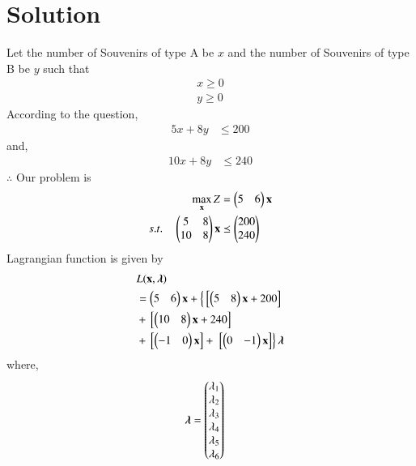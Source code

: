 \documentclass[journal,12pt,twocolumn]{IEEEtran}
\begin{document}
\section{Solution}
\begin{table}[!ht]
\centering
{}
\caption{Plywood Requirements}
\label{tab:table1}
\end{table}
Let the number of Souvenirs of type A be $x$ and the number of Souvenirs of type B be $y$  such that 
\begin{align}
    x \geq 0 \\
    y \geq 0 
\end{align}
According to the question,
\begin{align}
    5x+8y &\leq 200 
\end{align}
     and,
\begin{align}
    10x+8y &\leq 240 
\end{align}
$\therefore$ Our problem is
\begin{align}
        \max_{\mathbf{x}} Z &= \begin{pmatrix}5 & 6\end{pmatrix}\mathbf{x}\\
        s.t. \quad 
        \begin{pmatrix}5 & 8 \\ 10 & 8 \end{pmatrix}\mathbf{x} &\preceq \begin{pmatrix}200\\240\end{pmatrix} 
\end{align}
Lagrangian function is given by
\begin{equation}
\begin{aligned}
    &L(\mathbf{x},\boldsymbol{\lambda}) \\ &= \begin{pmatrix}5 & 6\end{pmatrix}\mathbf{x}+\left\{{}\left[\begin{pmatrix}5 & 8\end{pmatrix}\mathbf{x}+200\right]\right. \\ &+ {}\left[\begin{pmatrix}10 & 8\end{pmatrix}\mathbf{x}+240\right] \\ &+ {}\left[\begin{pmatrix}-1 & 0\end{pmatrix}\mathbf{x}\right] +\left.{}\left[\begin{pmatrix}0 & -1\end{pmatrix}\mathbf{x}\right]\right\}\boldsymbol{\lambda}
\end{aligned}
\end{equation}
where,
\begin{align}
    \boldsymbol{\lambda} &= \begin{pmatrix}\lambda_1 \\ \lambda_2 \\ \lambda_3 \\ \lambda_4 \\ \lambda_5 \\ \lambda_6\end{pmatrix}
\end{align}
\end{document}
